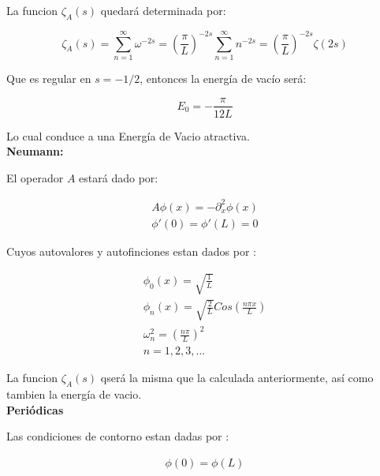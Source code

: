 La funcion $\zeta _A (s)$ quedará determinada por:

\begin{equation}
\zeta _A (s) = 
\sum _{n=1} ^{\infty} \omega ^{-2s} =  
\left( \frac{\pi}{L} \right) ^{-2s} \sum _{n=1} ^{\infty} n ^{-2s} = 
\left( \frac{\pi}{L} \right) ^{-2s} \zeta (2s)
\end{equation}

Que es regular en $s=-1/2$, entonces la energía de vacío será:

\begin{equation}
E _0 = - \frac{\pi}{12 L}
\end{equation}

Lo cual conduce a una Energía de Vacio atractiva. \\

\textbf{Neumann:}

El operador $A$ estará dado por:

\begin{equation}
\begin{array}{c}
	A \phi (x) = - \partial _x ^2 \phi (x) \\
    \phi ' (0) = \phi ' (L) = 0 
\end{array}
\end{equation}



Cuyos autovalores y autofinciones estan dados por  : 

\begin{equation}
\begin{array}{c}
	\phi _0 (x) = \sqrt{ \frac{1}{L} } \\
	\phi _n (x)  = \sqrt{\frac{2}{L}} Cos( \frac{n \pi x}{L} ) \\
	\omega _n ^2 = \left( \frac{n \pi }{L} \right) ^2 \\
	n = 1,2,3, ...
\end{array}
\end{equation}

La funcion $\zeta _A (s)$ qserá la misma que la calculada anteriormente, así como tambien la energía de vacio. \\

\textbf{Periódicas}

Las condiciones de contorno estan dadas por : 

\begin{equation}
\begin{array}{c}
    \phi (0) = \phi (L)  \\ 
\end{array}
\end{equation}

